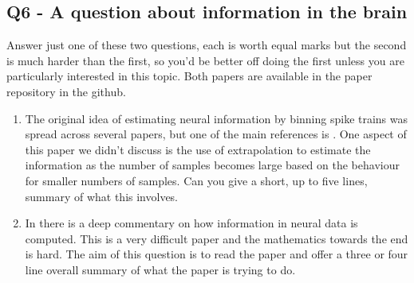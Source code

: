 \documentclass[12pt]{article}
\begin{document}
\subsection*{Q6 - A question about information in the brain}

Answer just one of these two questions, each is worth equal marks but the
second is much harder than the first, so you'd be better off doing the
first unless you are particularly interested in this topic. Both papers are available in the paper repository in the github.

\begin{enumerate}
\item The original idea of estimating neural information by binning
  spike trains was spread across several papers, but one of the main
  references is \cite{StrongEtAl1998}. One aspect of this paper we
  didn't discuss is the use of extrapolation to estimate the
  information as the number of samples becomes large based on the
  behaviour for smaller numbers of samples. Can you give a short, up
  to five lines, summary of what this involves.

\item In \cite{NemenmanEtAl2004} there is a deep commentary on how
  information in neural data is computed. This is a very difficult
  paper and the mathematics towards the end is hard. The aim of this
  question is to read the paper and offer a three or four line overall
  summary of what the paper is trying to do.
\end{enumerate}


{}
\end{document}
